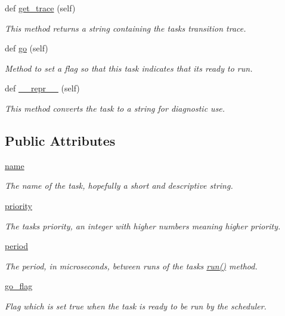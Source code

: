 \begin{DoxyCompactItemize}
def \hyperlink{classcotask_1_1Task_a6e51a228f985aec8c752bd72a73730ae}{get\+\_\+trace} (self)
\begin{DoxyCompactList}\small\item\em This method returns a string containing the task\textquotesingle{}s transition trace. \end{DoxyCompactList}\item 
def \hyperlink{classcotask_1_1Task_a78e74d18a5ba94074c2b5309394409a5}{go} (self)
\begin{DoxyCompactList}\small\item\em Method to set a flag so that this task indicates that it\textquotesingle{}s ready to run. \end{DoxyCompactList}\item 
def \hyperlink{classcotask_1_1Task_a2dcb50b9bf2676dfaac176649bc7d3f9}{\+\_\+\+\_\+repr\+\_\+\+\_\+} (self)
\begin{DoxyCompactList}\small\item\em This method converts the task to a string for diagnostic use. \end{DoxyCompactList}\end{DoxyCompactItemize}
\subsection*{Public Attributes}
\begin{DoxyCompactItemize}
\item 
\hyperlink{classcotask_1_1Task_ab54e069dd0b4f0a2f8e7f00c94998a10}{name}
\begin{DoxyCompactList}\small\item\em The name of the task, hopefully a short and descriptive string. \end{DoxyCompactList}\item 
\hyperlink{classcotask_1_1Task_aeced93c7b7d23e33de9693d278aef88b}{priority}
\begin{DoxyCompactList}\small\item\em The task\textquotesingle{}s priority, an integer with higher numbers meaning higher priority. \end{DoxyCompactList}\item 
\hyperlink{classcotask_1_1Task_a44f980f61f1908764c6821fa886590ca}{period}
\begin{DoxyCompactList}\small\item\em The period, in microseconds, between runs of the task\textquotesingle{}s {\ttfamily \hyperlink{print__task_8py_abe2a60b9d48d38a4c9ec85bd891aafca}{run()}} method. \end{DoxyCompactList}\item 
\hyperlink{classcotask_1_1Task_a96733bb9f4349a3f284083d1d4e64f9f}{go\+\_\+flag}\hypertarget{classcotask_1_1Task_a96733bb9f4349a3f284083d1d4e64f9f}{}\label{classcotask_1_1Task_a96733bb9f4349a3f284083d1d4e64f9f}

\begin{DoxyCompactList}\small\item\em Flag which is set true when the task is ready to be run by the scheduler. \end{DoxyCompactList}\end{DoxyCompactItemize}


